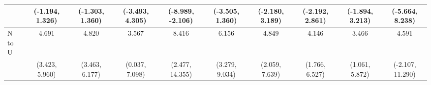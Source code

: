 {\begin{tabular}{l|c|c|c|c|c|c|c|c|c}
& {\scriptsize (-1.194, 1.326)}
& {\scriptsize (-1.303, 1.360)}
& {\scriptsize (-3.493, 4.305)}
& {\scriptsize (-8.989, -2.106)}
& {\scriptsize (-3.505, 1.360)}
& {\scriptsize (-2.180, 3.189)}
& {\scriptsize (-2.192, 2.861)}
& {\scriptsize (-1.894, 3.213)}
& {\scriptsize (-5.664, 8.238)}
\\ [0.1cm]
\hline
N to U
& 4.691 & 4.820 & 3.567 & 8.416 & 6.156 & 4.849 & 4.146 & 3.466 & 4.591 \\
& {\scriptsize (3.423, 5.960)}
& {\scriptsize (3.463, 6.177)}
& {\scriptsize (0.037, 7.098)}
& {\scriptsize (2.477, 14.355)}
& {\scriptsize (3.279, 9.034)}
& {\scriptsize (2.059, 7.639)}
& {\scriptsize (1.766, 6.527)}
& {\scriptsize (1.061, 5.872)}
& {\scriptsize (-2.107, 11.290)}
\\ [0.1cm]
\hline
\hline
\end{tabular}
}

